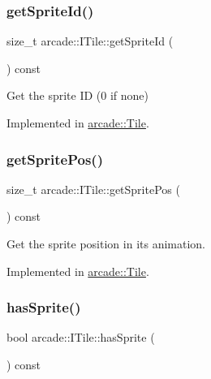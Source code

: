 \subsubsection{\texorpdfstring{get\+Sprite\+Id()}{getSpriteId()}}
{\footnotesize\ttfamily size\+\_\+t arcade\+::\+I\+Tile\+::get\+Sprite\+Id (\begin{DoxyParamCaption}{ }\end{DoxyParamCaption}) const\hspace{0.3cm}{\ttfamily [pure virtual]}}



Get the sprite ID (0 if none) 



Implemented in \hyperlink{classarcade_1_1_tile_afe2b3e7b4a6880b03772c240a2122d16}{arcade\+::\+Tile}.

\mbox{\label{classarcade_1_1_i_tile_a3e5cec4407ef6afb7e10d82fb1c93f5e}} 
\subsubsection{\texorpdfstring{get\+Sprite\+Pos()}{getSpritePos()}}
{\footnotesize\ttfamily size\+\_\+t arcade\+::\+I\+Tile\+::get\+Sprite\+Pos (\begin{DoxyParamCaption}{ }\end{DoxyParamCaption}) const\hspace{0.3cm}{\ttfamily [pure virtual]}}



Get the sprite position in it\textquotesingle{}s animation. 



Implemented in \hyperlink{classarcade_1_1_tile_a0dfe91e5896b8cfc3afac522d901be0a}{arcade\+::\+Tile}.

\mbox{\label{classarcade_1_1_i_tile_ab2d6a5f8d4cfc6c606b8ad13d8dd88a4}} 
\subsubsection{\texorpdfstring{has\+Sprite()}{hasSprite()}}
{\footnotesize\ttfamily bool arcade\+::\+I\+Tile\+::has\+Sprite (\begin{DoxyParamCaption}{ }\end{DoxyParamCaption}) const\hspace{0.3cm}{\ttfamily [pure virtual]}}



